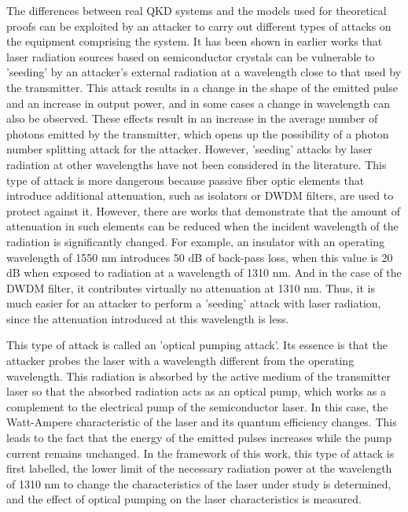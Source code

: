 The differences between real QKD systems and the models used for theoretical proofs can be exploited by an attacker to carry out different types of attacks on the equipment comprising the system. It has been shown in earlier works that laser radiation sources based on semiconductor crystals can be vulnerable to 'seeding' by an attacker's external radiation at a wavelength close to that used by the transmitter. This attack results in a change in the shape of the emitted pulse and an increase in output power, and in some cases a change in wavelength can also be observed. These effects result in an increase in the average number of photons emitted by the transmitter, which opens up the possibility of a photon number splitting attack for the attacker. 
However, 'seeding' attacks by laser radiation at other wavelengths have not been considered in the literature. This type of attack is more dangerous because passive fiber optic elements that introduce additional attenuation, such as isolators or DWDM filters, are used to protect against it. However, there are works that demonstrate that the amount of attenuation in such elements can be reduced when the incident wavelength of the radiation is significantly changed. For example, an insulator with an operating wavelength of 1550 nm introduces 50 dB of back-pass loss, when this value is 20 dB when exposed to radiation at a wavelength of 1310 nm. And in the case of the DWDM filter, it contributes virtually no attenuation at 1310 nm. Thus, it is much easier for an attacker to perform a 'seeding' attack with laser radiation, since the attenuation introduced at this wavelength is less. 

This type of attack is called an 'optical pumping attack'. Its essence is that the attacker probes the laser with a wavelength different from the operating wavelength. This radiation is absorbed by the active medium of the transmitter laser so that the absorbed radiation acts as an optical pump, which works as a complement to the electrical pump of the semiconductor laser. In this case, the Watt-Ampere characteristic of the laser and its quantum efficiency changes. This leads to the fact that the energy of the emitted pulses increases while the pump current remains unchanged. In the framework of this work, this type of attack is first labelled, the lower limit of the necessary radiation power at the wavelength of 1310 nm to change the characteristics of the laser under study is determined, and the effect of optical pumping on the laser characteristics is measured. 

